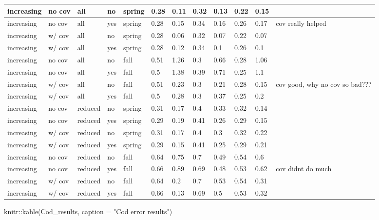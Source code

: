 \documentclass[
  12pt,
]{article}
\newenvironment{Shaded}{\begin{snugshade}}{\end{snugshade}}
\newcommand{\AttributeTok}[1]{\textcolor[rgb]{0.77,0.63,0.00}{#1}}
\newcommand{\FunctionTok}[1]{\textcolor[rgb]{0.00,0.00,0.00}{#1}}
\newcommand{\NormalTok}[1]{#1}
\newcommand{\SpecialCharTok}[1]{\textcolor[rgb]{0.00,0.00,0.00}{#1}}
\newcommand{\StringTok}[1]{\textcolor[rgb]{0.31,0.60,0.02}{#1}}
\begin{document}
\begin{table}
\begin{tabular}[t]{l|l|l|l|l|l|l|l|l|l|l|l}
\hline
increasing & no cov & all & no & spring & 0.28 & 0.11 & 0.32 & 0.13 & 0.22 & 0.15 & \\
\hline
increasing & no cov & all & yes & spring & 0.28 & 0.15 & 0.34 & 0.16 & 0.26 & 0.17 & cov really helped\\
\hline
increasing & w/ cov & all & no & spring & 0.28 & 0.06 & 0.32 & 0.07 & 0.22 & 0.07 & \\
\hline
increasing & w/ cov & all & yes & spring & 0.28 & 0.12 & 0.34 & 0.1 & 0.26 & 0.1 & \\
\hline
increasing & no cov & all & no & fall & 0.51 & 1.26 & 0.3 & 0.66 & 0.28 & 1.06 & \\
\hline
increasing & no cov & all & yes & fall & 0.5 & 1.38 & 0.39 & 0.71 & 0.25 & 1.1 & \\
\hline
increasing & w/ cov & all & no & fall & 0.51 & 0.23 & 0.3 & 0.21 & 0.28 & 0.15 & cov good, why no cov so bad???\\
\hline
increasing & w/ cov & all & yes & fall & 0.5 & 0.28 & 0.3 & 0.37 & 0.25 & 0.2 & \\
\hline
increasing & no cov & reduced & no & spring & 0.31 & 0.17 & 0.4 & 0.33 & 0.32 & 0.14 & \\
\hline
increasing & no cov & reduced & yes & spring & 0.29 & 0.19 & 0.41 & 0.26 & 0.29 & 0.15 & \\
\hline
increasing & w/ cov & reduced & no & spring & 0.31 & 0.17 & 0.4 & 0.3 & 0.32 & 0.22 & \\
\hline
increasing & w/ cov & reduced & yes & spring & 0.29 & 0.15 & 0.41 & 0.25 & 0.29 & 0.21 & \\
\hline
increasing & no cov & reduced & no & fall & 0.64 & 0.75 & 0.7 & 0.49 & 0.54 & 0.6 & \\
\hline
increasing & no cov & reduced & yes & fall & 0.66 & 0.89 & 0.69 & 0.48 & 0.53 & 0.62 & cov didnt do much\\
\hline
increasing & w/ cov & reduced & no & fall & 0.64 & 0.2 & 0.7 & 0.53 & 0.54 & 0.31 & \\
\hline
increasing & w/ cov & reduced & yes & fall & 0.66 & 0.13 & 0.69 & 0.5 & 0.53 & 0.32 & \\
\hline
\end{tabular}
\end{table}

\begin{Shaded}
\begin{Highlighting}[]
\NormalTok{knitr}\SpecialCharTok{::}\FunctionTok{kable}\NormalTok{(Cod\_results, }\AttributeTok{caption =} \StringTok{"Cod error results"}\NormalTok{)}
\end{Highlighting}
\end{Shaded}
\end{document}
